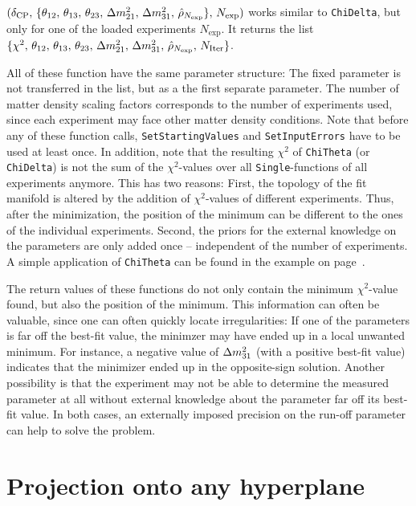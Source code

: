 \begin{function}
$( \delta_{\mathrm{CP}}, \, \{ \theta_{12}, \, \theta_{13}, \, \theta_{23}, \, \Delta m_{21}^2 , \, \Delta m_{31}^2, \,  \hat{\rho}_{N_{\mathrm{exp}}} \}, \, N_{\mathrm{exp}})$ works similar to {\tt ChiDelta}, but only for one of the loaded experiments $N_{\mathrm{exp}}$. It returns the list $\{ \chi^2, \, \theta_{12}, \,  \theta_{13}, \,  \theta_{23}, \, \Delta m_{21}^2 , \, \Delta m_{31}^2, \, \hat{\rho}_{N_{\mathrm{exp}}} , \, N_{\mathrm{Iter}} \}$.
\end{function}
All of these function have the same parameter structure: The fixed parameter is not transferred in the list, but as a the first separate parameter. The number of matter density scaling factors corresponds to the number of experiments used, since each experiment may face other matter density conditions. Note that before any of these function calls, {\tt SetStartingValues} and {\tt SetInputErrors} have to be used at least once. In addition, note that the resulting $\chi^2$ of {\tt ChiTheta} (or {\tt ChiDelta}) is not the sum of the $\chi^2$-values over all {\tt Single}-functions of all experiments anymore. This has two reasons: First, the topology of the fit manifold is altered by the addition of $\chi^2$-values of different experiments. Thus, after the minimization, the position of the minimum can be different to the ones of the individual experiments. Second, the priors for the external knowledge on the parameters are only added once -- independent of the number of experiments. A simple application of {\tt ChiTheta} can be found in the example on page~\pageref{ex:corrproj}. 

The return values of these functions do not only contain the minimum $\chi^2$-value found, but also the position of the minimum. This information can often be valuable, since one can often quickly locate irregularities: If one of the parameters is far off the best-fit value, the minimzer may have ended up in a local unwanted minimum. For instance, a negative value of $\Delta m_{31}^2$ (with a positive best-fit value) indicates that the minimizer ended up in the opposite-sign solution. Another possibility is that the experiment may not be able to determine the measured parameter at all without external knowledge about the parameter far off its best-fit value. In both cases, an externally imposed precision on the run-off parameter can help to solve the problem. 

\section[Projection onto any hyperplane]{Projection onto any  hyperplane}

